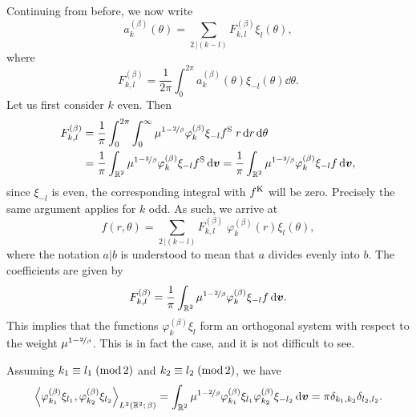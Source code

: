 Continuing from before, we now write
\[
    a_k^{(\beta)}(\theta) = \sum_{2\,|(k-l)} F_{k,l}^{(\beta)} \xi_l(\theta),
\]
where
\[
    F_{k,l}^{(\beta)} = \frac{1}{2\pi} \int_0^{2\pi} a_k^{(\beta)}(\theta) \xi_{-l}(\theta) \dd\theta.
\]
Let us first consider $k$ even. Then
\begin{align*}
    F_{k,l}^{(\beta)} &= \frac{1}{\pi} \int_0^{2\pi} \int_0^\infty \mu^{1-\nicefrac{2}{\beta}}
             \varphi_k^{(\beta)} \xi_{-l} f^{\mathrm{S}} \; r \,\mathrm{d} r \,\mathrm{d}\theta \\
          &= \frac{1}{\pi} \int_{\mathbb{R}^2} \mu^{1-\nicefrac{2}{\beta}} \varphi_k^{(\beta)} 
             \xi_{-l} f^{\mathrm{S}} \,\mathrm{d} {\bm v}
           = \frac{1}{\pi} \int_{\mathbb{R}^2} \mu^{1-\nicefrac{2}{\beta}} \varphi_k^{(\beta)} 
             \xi_{-l} f \,\mathrm{d} {\bm v},
\end{align*}
since $\xi_{-l}$ is even, the corresponding integral with $f^{\mathrm{K}}$ will be zero. Precisely the same argument
applies for $k$ odd. As such, we arrive at
\begin{equation} \label{eqn:polexp}
    f(r,\theta) = \sum_{2\,|(k-l)} F_{k,l}^{(\beta)} \; \varphi_k^{(\beta)} (r) \xi_l(\theta),
\end{equation}
where the notation $a|b$ is understood to mean that $a$ divides evenly into $b$. The coefficients are given by
\[
    F_{k,l}^{(\beta)} = \frac{1}{\pi} \int_{\mathbb{R}^2} \mu^{1-\nicefrac{2}{\beta}} 
                        \varphi_k^{(\beta)} \xi_{-l} f \,\mathrm{d}{\bm v}.
\]
This implies that the functions $\varphi_k^{(\beta)}\xi_l$ form an orthogonal system with respect to the
weight $\mu^{1-\nicefrac{2}{\beta}}$. This is in fact the case, and it is not difficult to see.
\begin{proposition} \label{prop:orthopol}
Assuming $k_1 \equiv l_1\;(\operatorname{mod}2)$ and $k_2\equiv l_2\;(\operatorname{mod}2)$, we have
\[
    \left\langle \varphi_{k_1}^{(\beta)} \xi_{l_1}, \varphi_{k_2}^{(\beta)} \xi_{l_2} 
    \right\rangle_{L^2(\mathbb{R}^2;\,\beta)} 
    = \int_{\mathbb{R}^2} \mu^{1-\nicefrac{2}{\beta}} 
      \varphi_{k_1}^{(\beta)} \xi_{l_1} \varphi_{k_2}^{(\beta)} \xi_{-l_2} \,\mathrm{d}{\bm v}
    = \pi \delta_{k_1,k_2} \delta_{l_2,l_2}.
\]
\end{proposition}
